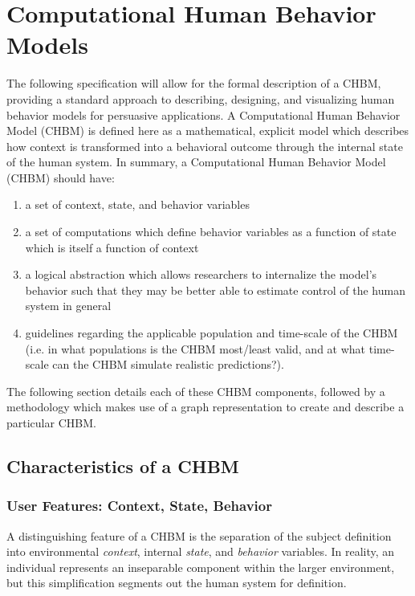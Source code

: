 \documentclass[runningheads,a4paper]{llncs}
\begin{document}
\section{Computational Human Behavior Models}
The following specification will allow for the formal description of a CHBM, providing a standard approach to describing, designing, and visualizing human behavior models for persuasive applications.
A Computational Human Behavior Model (CHBM) is defined here as a mathematical, explicit model which describes how context is transformed into a behavioral outcome through the internal state of the human system.
In summary, a Computational Human Behavior Model (CHBM) should have: 
\begin{enumerate}
    \item a set of context, state, and behavior variables
    \item a set of computations which define behavior variables as a function of state which is itself a function of context
    \item a logical abstraction which allows researchers to internalize the model's behavior such that they may be better able to estimate control of the human system in general
    \item guidelines regarding the applicable population and time-scale of the CHBM (i.e. in what populations is the CHBM most/least valid, and at what time-scale can the CHBM simulate realistic predictions?). 
\end{enumerate}

The following section details each of these CHBM components, followed by a methodology which makes use of a graph representation to create and describe a particular CHBM.

\subsection{Characteristics of a CHBM}
\subsubsection{User Features: Context, State, Behavior}
A distinguishing feature of a CHBM is the separation of the subject definition into environmental \emph{context}, internal \emph{state}, and \emph{behavior} variables.
In reality, an individual represents an inseparable component within the larger environment, but this simplification segments out the human system for definition.
\end{document}
